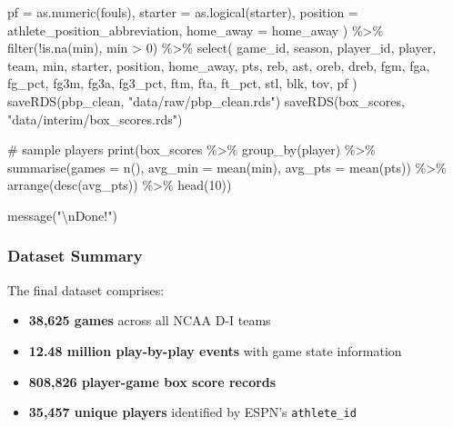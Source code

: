 \documentclass[
  letterpaper,
  DIV=11,
  numbers=noendperiod]{scrartcl}
\newenvironment{Shaded}{\begin{snugshade}}{\end{snugshade}}
\newcommand{\AttributeTok}[1]{\textcolor[rgb]{0.40,0.45,0.13}{#1}}
\newcommand{\CommentTok}[1]{\textcolor[rgb]{0.37,0.37,0.37}{#1}}
\newcommand{\DecValTok}[1]{\textcolor[rgb]{0.68,0.00,0.00}{#1}}
\newcommand{\FunctionTok}[1]{\textcolor[rgb]{0.28,0.35,0.67}{#1}}
\newcommand{\NormalTok}[1]{\textcolor[rgb]{0.00,0.23,0.31}{#1}}
\newcommand{\SpecialCharTok}[1]{\textcolor[rgb]{0.37,0.37,0.37}{#1}}
\newcommand{\StringTok}[1]{\textcolor[rgb]{0.13,0.47,0.30}{#1}}
\providecommand{\tightlist}{%
  \setlength{\itemsep}{0pt}\setlength{\parskip}{0pt}}
\begin{document}
\begin{Shaded}
\begin{Highlighting}[]
    \AttributeTok{pf =} \FunctionTok{as.numeric}\NormalTok{(fouls),}
    \AttributeTok{starter =} \FunctionTok{as.logical}\NormalTok{(starter),}
    \AttributeTok{position =}\NormalTok{ athlete\_position\_abbreviation,}
    \AttributeTok{home\_away =}\NormalTok{ home\_away}
\NormalTok{  ) }\SpecialCharTok{\%\textgreater{}\%}
  \FunctionTok{filter}\NormalTok{(}\SpecialCharTok{!}\FunctionTok{is.na}\NormalTok{(min), min }\SpecialCharTok{\textgreater{}} \DecValTok{0}\NormalTok{) }\SpecialCharTok{\%\textgreater{}\%}
  \FunctionTok{select}\NormalTok{(}
\NormalTok{    game\_id, season, player\_id, player, team, min, starter, position, home\_away,}
\NormalTok{    pts, reb, ast, oreb, dreb,}
\NormalTok{    fgm, fga, fg\_pct, fg3m, fg3a, fg3\_pct,}
\NormalTok{    ftm, fta, ft\_pct, stl, blk, tov, pf}
\NormalTok{  )}
\FunctionTok{saveRDS}\NormalTok{(pbp\_clean, }\StringTok{"data/raw/pbp\_clean.rds"}\NormalTok{)}
\FunctionTok{saveRDS}\NormalTok{(box\_scores, }\StringTok{"data/interim/box\_scores.rds"}\NormalTok{)}

\CommentTok{\# sample players}
\FunctionTok{print}\NormalTok{(box\_scores }\SpecialCharTok{\%\textgreater{}\%}
  \FunctionTok{group\_by}\NormalTok{(player) }\SpecialCharTok{\%\textgreater{}\%}
  \FunctionTok{summarise}\NormalTok{(}\AttributeTok{games =} \FunctionTok{n}\NormalTok{(), }\AttributeTok{avg\_min =} \FunctionTok{mean}\NormalTok{(min), }\AttributeTok{avg\_pts =} \FunctionTok{mean}\NormalTok{(pts)) }\SpecialCharTok{\%\textgreater{}\%}
  \FunctionTok{arrange}\NormalTok{(}\FunctionTok{desc}\NormalTok{(avg\_pts)) }\SpecialCharTok{\%\textgreater{}\%}
  \FunctionTok{head}\NormalTok{(}\DecValTok{10}\NormalTok{))}

\FunctionTok{message}\NormalTok{(}\StringTok{"}\SpecialCharTok{\textbackslash{}n}\StringTok{Done!"}\NormalTok{)}
\end{Highlighting}
\end{Shaded}

\subsubsection{Dataset Summary}\label{dataset-summary}

The final dataset comprises:

\begin{itemize}
\tightlist
\item
  \textbf{38,625 games} across all NCAA D-I teams
\item
  \textbf{12.48 million play-by-play events} with game state information
\item
  \textbf{808,826 player-game box score records}
\item
  \textbf{35,457 unique players} identified by ESPN's
  \texttt{athlete\_id}
\end{itemize}
\end{document}
